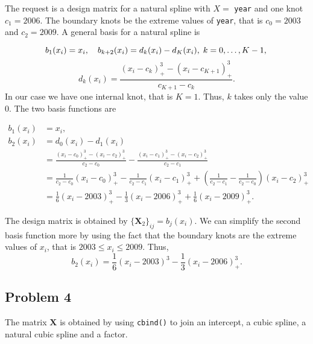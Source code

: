 \documentclass[]{article}
\begin{document}
The request is a design matrix for a natural spline with \(X =\)
\texttt{year} and one knot \(c_1 = 2006\). The boundary knots be the
extreme values of \texttt{year}, that is \(c_0 = 2003\) and
\(c_2 = 2009\). A general basis for a natural spline is

\[
b_1(x_i) = x_i, \quad b_{k+2}(x_i) = d_k(x_i)-d_K(x_i),\; k = 0, \ldots, K - 1,\\
\] \[
d_k(x_i) = \frac{(x_i-c_k)^3_+-(x_i-c_{K+1})^3_+}{c_{K+1}-c_k}.
\] In our case we have one internal knot, that is \(K=1\). Thus, \(k\)
takes only the value 0. The two basis functions are

\begin{align*}
b_1(x_i) &= x_i,\\
b_2(x_i) &= d_0(x_i)-d_1(x_i)\\
&= \frac{(x_i-c_0)^3_+-(x_i-c_2)^3_+}{c_2-c_0} - \frac{(x_i-c_1)^3_+-(x_i-c_2)^3_+}{c_2-c_1}\\
&= \frac{1}{c_2-c_0}(x_i-c_0)^3_+ - \frac{1}{c_2-c_1}(x_i-c_1)^3_+ + \left(\frac{1}{c_2-c_1}-\frac{1}{c_2-c_0}\right)(x_i-c_{2})^3_+\\
&= \frac{1}{6}(x_i-2003)^3_+ - \frac{1}{3}(x_i-2006)^3_+ + \frac{1}{6}(x_i-2009)^3_+.
\end{align*}

The design matrix is obtained by \(\{\mathbf X_2\}_{ij} = b_j(x_i)\). We
can simplify the second basis function more by using the fact that the
boundary knots are the extreme values of \(x_i\), that is
\(2003 \leq x_i \leq 2009\). Thus, \[
b_2(x_i) = \frac{1}{6}(x_i-2003)^3 - \frac{1}{3}(x_i-2006)^3_+.
\]

\subsection{Problem 4}\label{problem-4}

The matrix \(\mathbf X\) is obtained by using \texttt{cbind()} to join
an intercept, a cubic spline, a natural cubic spline and a factor.
\end{document}
